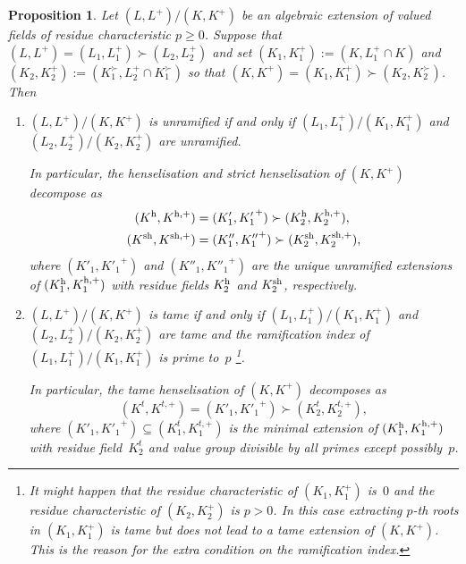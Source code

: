 \documentclass[a4paper,twoside,11pt,reqno]{amsart}
\newcommand{\sh}{{\rm sh}}   %
\newcommand{\rh}{{\rm h}}  %
\newtheorem{prop}[thm]{Proposition}
\theoremstyle{definition}
\numberwithin{equation}{subsection}
\begin{document}
\begin{prop} \label{composition-tame}
    Let $(L,L^+)/(K,K^+)$ be an algebraic extension of valued fields of residue characteristic $p \ge 0$.
    Suppose that $(L,L^+) = (L_1,L_1^+) \succ (L_2,L_2^+)$ and set $(K_1,K_1^+) := (K,L_1^+ \cap K)$ and $(K_2,K_2^+) := (K_1^\succ,L_2^+ \cap K_1^\succ)$ so that $(K,K^+) = (K_1,K_1^+) \succ (K_2,K_2^\succ)$.
    Then
    \begin{enumerate}[ref=(\arabic*)]
        \item \label{lemitem:composition etale}
        $(L,L^+)/(K,K^+)$ is unramified if and only if $(L_1,L_1^+)/(K_1,K_1^+)$ and $(L_2,L_2^+)/(K_2,K_2^+)$ are unramified.
        
        In particular, the henselisation and strict henselisation of $(K,K^+)$ decompose as
        \begin{align*}
            (K^\rh,K^{\rh,+}) &= (K'_1,{K'_1}^+) \succ (K_2^\rh,K_2^{\rh,+}),   \\
            (K^\sh,K^{\sh,+}) &= (K''_1,{K''_1}^+) \succ (K_2^\sh,K_2^{\sh,+}),
        \end{align*}
        where $(K'_1,{K'_1}^+)$ and $(K''_1,{K''_1}^+)$ are the unique unramified extensions of $(K_1^\rh,K_1^{\rh,+})$ with residue fields $K_2^\rh$ and $K_2^\sh$, respectively.
        \item \label{lemitem:composition tame}
        $(L,L^+)/(K,K^+)$ is tame if and only if $(L_1,L_1^+)/(K_1,K_1^+)$ and $(L_2,L_2^+)/(K_2,K_2^+)$ are tame and the ramification index of $(L_1,L_1^+)/(K_1,K_1^+)$ is prime to~$p$ \footnote{It might happen that the residue characteristic of $(K_1,K_1^+)$ is~$0$ and the residue characteristic of $(K_2,K_2^+)$ is $p > 0$.
        In this case extracting $p$-th roots in $(K_1,K_1^+)$ is tame but does not lead to a tame extension of $(K,K^+)$.
        This is the reason for the extra condition on the ramification index.}.

        In particular, the tame henselisation of $(K,K^+)$ decomposes as
        \[
            (K^t,K^{t,+}) = (K'_1,{K'_1}^+) \succ (K_2^t,K_2^{t,+}),
        \]
         where $(K'_1,{K'_1}^+) \subseteq (K_1^t,K_1^{t,+})$ is the minimal extension of $(K_1^\rh,K_1^{\rh,+})$ with residue field~$K_2^t$ and value group divisible by all primes except possibly~$p$.
    \end{enumerate}
\end{prop}
\end{document}
